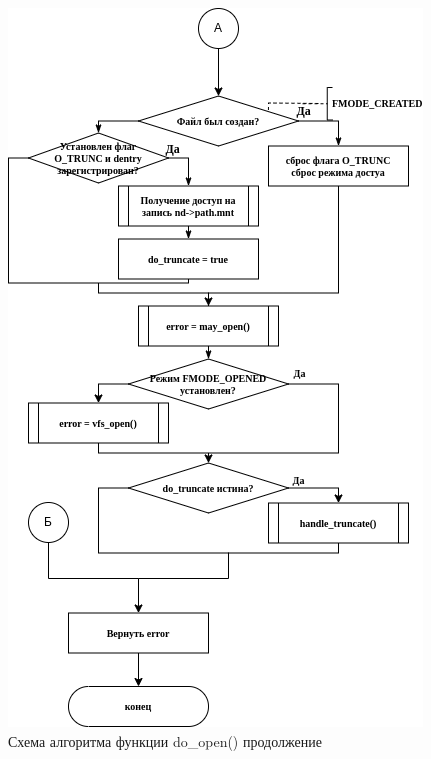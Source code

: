 \begin{figure}[H]
	\centering
	\includegraphics[scale=0.7]{assets/lab06 (2)-do_open_2.drawio.png}
	\caption{Схема алгоритма функции do\_open() продолжение}
\end{figure}
